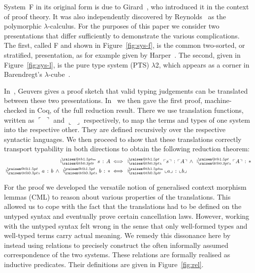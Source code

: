 \documentclass[a4paper,UKenglish]{lipics-v2016}
\makeatletter
\newcommand{\fromF}[1]{\ulcorner#1\urcorner}
\newcommand{\toF}[1]{\llcorner#1\lrcorner}
\newcommand{\ms}{\,}
\newcommand{\mrel}[1]{\mathrel{\ms #1 \ms}}
\newcommand{\OF}{\mrel{:}}
\newcommand{\mAnd}{\mrel{\wedge}}
\newcommand{\SysL}{$\lambda$2\xspace}
\newcommand{\tm}{\mathsf{tm}}
\newcommand{\raisemath}[1]{\mathpalette{\raisem@th{#1}}}
\newcommand{\raisem@th}[3]{\raisebox{#1}{\ensuremath{#2#3}}}
\newcommand{\tsAnnot}[2]{\vdash\hspace{-.7em}^{\raisemath{1.5pt}{\scriptscriptstyle{#2}}}_{\raisemath{0.3pt}{\scriptscriptstyle{#1}}}} %
\newcommand{\tyF}{\tsAnnot{\mathsf{F}}{\tm}}  %
\newcommand{\typingF}[3]{\ensuremath{{#1} \mathrel{\tyF} #2 \OF #3}}
\newcommand{\tyL}{\tsAnnot{\lambda}{}} %
\newcommand{\typingL}[3]{\ensuremath{{#1} \mathrel{\tyL} #2 \OF #3}}
\newcommand{\Prp}{\ensuremath{\textrm{\textasteriskcentered}}}
\makeatother
\begin{document}
System~F in its original form is due to Girard~\cite{Girard1972, Girard1989}, who introduced it in the context of proof theory.
It was also independently discovered by Reynolds~\cite{DBLP:conf/programm/Reynolds74} as the polymorphic $\lambda$-calculus.
For the purposes of this paper we consider two presentations that differ sufficiently to demonstrate the various complications.
The first, called F and shown in Figure~\ref{fig:sys-f}, is the common two-sorted, or stratified, presentation, as for example given by Harper~\cite{Harper2013}.
The second, given in Figure~\ref{fig:sys-l}, is the pure type system (PTS) \SysL, which appears as a corner in Barendregt's $\lambda$-cube~\cite{DBLP:journals/jfp/Barendregt91}.

In~\cite{Geuvers1993}, Geuvers gives a proof sketch that valid typing judgements can be translated between these two presentations.
In~\cite{KaiserEtAl:2017:sysf_pts_equiv_coq} we then gave the first proof, machine-checked in Coq, of the full reduction result.
There we use translation functions, written as $\fromF{~}$ and $\toF{~}$ respectively, to map the terms and types of one system into the respective other. 
They are defined recursively over the respective syntactic languages.
We then proceed to show that these translations correctly transport typability in both directions to obtain the following reduction theorem:
\begin{align*}
  \typingF{}{s}{A} &\iff \typingL{}{\fromF s}{\fromF A} \mAnd \typingL{}{\fromF  A}{\Prp}\\
  \typingL{}{a}{b} \mAnd \typingL{}{b}{\Prp} &\iff \typingF{}{\toF a}{\toF b}
\end{align*}

For the proof we developed the versatile notion of generalised context morphism lemmas (CML) to reason about various properties of the translations.
This allowed us to cope with the fact that the translations had to be defined on the untyped syntax and eventually prove certain cancellation laws.
However, working with the untyped syntax felt wrong in the sense that only well-formed types and well-typed terms carry actual meaning.
We remedy this dissonance here by instead using relations to precisely construct the often informally assumed correspondence of the two systems.
These relations are formally realised as inductive predicates.
Their definitions are given in Figure~\ref{fig:rel}.
\end{document}
